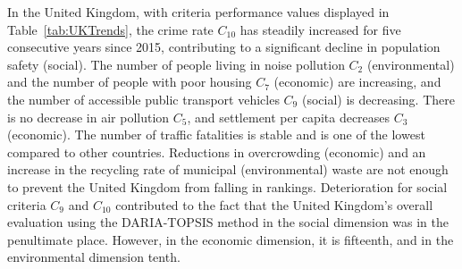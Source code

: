 \documentclass[5p,times]{elsarticle}
\begin{document}
In the United Kingdom, with criteria performance values displayed in Table~\ref{tab:UKTrends}, the crime rate $C_{10}$ has steadily increased for five consecutive years since 2015, contributing to a significant decline in population safety (social). The number of people living in noise pollution $C_{2}$ (environmental) and the number of people with poor housing $C_{7}$ (economic) are increasing, and the number of accessible public transport vehicles $C_{9}$ (social) is decreasing. There is no decrease in air pollution $C_{5}$, and settlement per capita decreases $C_{3}$ (economic). The number of traffic fatalities is stable and is one of the lowest compared to other countries. Reductions in overcrowding (economic) and an increase in the recycling rate of municipal (environmental) waste are not enough to prevent the United Kingdom from falling in rankings. Deterioration for social criteria $C_{9}$ and $C_{10}$ contributed to the fact that the United Kingdom's overall evaluation using the DARIA-TOPSIS method in the social dimension was in the penultimate place. However, in the economic dimension, it is fifteenth, and in the environmental dimension tenth.
%
\begin{table}[H]
\centering
\caption{Trends in sustainability indicators published by Eurostat for Finland.}
\label{tab:FinlandTrends}
\end{table}
\end{document}
